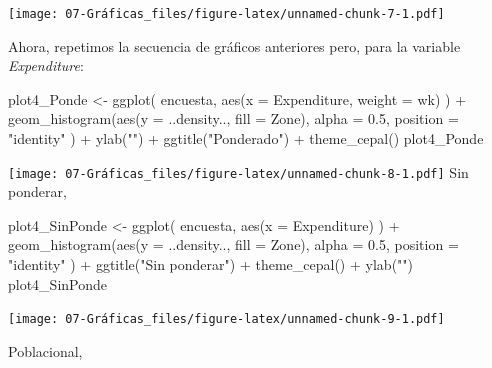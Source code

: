 \documentclass[
  12pt,
]{book}
\newenvironment{Shaded}{\begin{snugshade}}{\end{snugshade}}
\newcommand{\AttributeTok}[1]{\textcolor[rgb]{0.77,0.63,0.00}{#1}}
\newcommand{\FloatTok}[1]{\textcolor[rgb]{0.00,0.00,0.81}{#1}}
\newcommand{\FunctionTok}[1]{\textcolor[rgb]{0.00,0.00,0.00}{#1}}
\newcommand{\NormalTok}[1]{#1}
\newcommand{\OtherTok}[1]{\textcolor[rgb]{0.56,0.35,0.01}{#1}}
\newcommand{\SpecialCharTok}[1]{\textcolor[rgb]{0.00,0.00,0.00}{#1}}
\newcommand{\StringTok}[1]{\textcolor[rgb]{0.31,0.60,0.02}{#1}}
\begin{document}
\texttt{[image: 07-Gráficas\_files/figure-latex/unnamed-chunk-7-1.pdf]}

Ahora, repetimos la secuencia de gráficos anteriores pero, para la variable \emph{Expenditure}:

\begin{Shaded}
\begin{Highlighting}[]
\NormalTok{plot4\_Ponde }\OtherTok{\textless{}{-}} \FunctionTok{ggplot}\NormalTok{(}
\NormalTok{  encuesta,}
  \FunctionTok{aes}\NormalTok{(}\AttributeTok{x =}\NormalTok{ Expenditure, }\AttributeTok{weight =}\NormalTok{ wk)}
\NormalTok{) }\SpecialCharTok{+}
  \FunctionTok{geom\_histogram}\NormalTok{(}\FunctionTok{aes}\NormalTok{(}\AttributeTok{y =}\NormalTok{ ..density.., }\AttributeTok{fill =}\NormalTok{ Zone),}
    \AttributeTok{alpha =} \FloatTok{0.5}\NormalTok{, }\AttributeTok{position =} \StringTok{"identity"}
\NormalTok{  ) }\SpecialCharTok{+}
  \FunctionTok{ylab}\NormalTok{(}\StringTok{""}\NormalTok{) }\SpecialCharTok{+}
  \FunctionTok{ggtitle}\NormalTok{(}\StringTok{"Ponderado"}\NormalTok{) }\SpecialCharTok{+}
  \FunctionTok{theme\_cepal}\NormalTok{()}
\NormalTok{plot4\_Ponde}
\end{Highlighting}
\end{Shaded}

\texttt{[image: 07-Gráficas\_files/figure-latex/unnamed-chunk-8-1.pdf]}
Sin ponderar,

\begin{Shaded}
\begin{Highlighting}[]
\NormalTok{plot4\_SinPonde }\OtherTok{\textless{}{-}} \FunctionTok{ggplot}\NormalTok{(}
\NormalTok{  encuesta,}
  \FunctionTok{aes}\NormalTok{(}\AttributeTok{x =}\NormalTok{ Expenditure)}
\NormalTok{) }\SpecialCharTok{+}
  \FunctionTok{geom\_histogram}\NormalTok{(}\FunctionTok{aes}\NormalTok{(}\AttributeTok{y =}\NormalTok{ ..density.., }\AttributeTok{fill =}\NormalTok{ Zone),}
    \AttributeTok{alpha =} \FloatTok{0.5}\NormalTok{, }\AttributeTok{position =} \StringTok{"identity"}
\NormalTok{  ) }\SpecialCharTok{+}
  \FunctionTok{ggtitle}\NormalTok{(}\StringTok{"Sin ponderar"}\NormalTok{) }\SpecialCharTok{+}
  \FunctionTok{theme\_cepal}\NormalTok{() }\SpecialCharTok{+}
  \FunctionTok{ylab}\NormalTok{(}\StringTok{""}\NormalTok{)}
\NormalTok{plot4\_SinPonde}
\end{Highlighting}
\end{Shaded}

\texttt{[image: 07-Gráficas\_files/figure-latex/unnamed-chunk-9-1.pdf]}

Poblacional,
\end{document}
